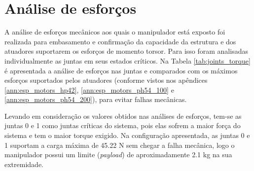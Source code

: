\section{Análise de esforços}
A análise de esforços mecânicos aos quais o manipulador está exposto foi realizada para embasamento e confirmação da capacidade da estrutura e dos atuadores suportarem os esforços de momento torsor. Para isso foram analisadas individualmente as juntas em seus estados críticos. Na Tabela \ref{tab:joints_torque} é apresentada a análise de esforços nas juntas e comparados com os máximos esforços suportados pelos atuadores (conforme vistos nos apêndices \ref{ann:esp_motors_hp42}, \ref{ann:esp_motors_ph54_100} e \ref{ann:esp_motors_ph54_200}), para evitar falhas mecânicas.

Levando em consideração os valores obtidos nas análises de esforços, tem-se as juntas 0 e 1 como juntas críticas do sistema, pois elas sofrem a maior força do sistema e tem o maior torque exigido. Na configuração apresentada, as juntas 0 e 1 suportam a carga máxima de 45.22 N sem chegar a falha mecânica, logo o manipulador possui um limite (\emph{payload}) de aproximadamente 2.1 kg na sua extremidade.


